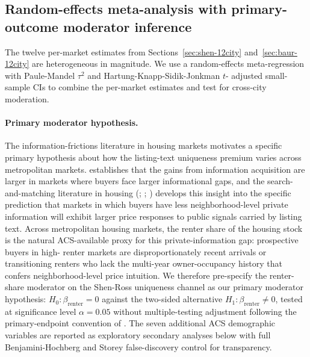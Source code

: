 
\subsection{Random-effects meta-analysis with primary-outcome moderator inference}
\label{sec:meta-regression-12}

The twelve per-market estimates from Sections~\ref{sec:shen-12city}
and~\ref{sec:baur-12city} are heterogeneous in magnitude.  We use a
random-effects meta-regression with Paule-Mandel $\tau^2$
\citep{paule1982consensus} and Hartung-Knapp-Sidik-Jonkman $t$-
adjusted small-sample CIs \citep{inthout2014hartung} to combine the
per-market estimates and test for cross-city moderation.

\paragraph{Primary moderator hypothesis.}
The information-frictions literature in housing markets motivates a
specific primary hypothesis about how the listing-text uniqueness
premium varies across metropolitan markets.
\citet{stigler1961economics} establishes that the gains from information
acquisition are larger in markets where buyers face larger
informational gaps, and the search-and-matching literature in housing
(\citealt{genesove1997equity}; \citealt{bayer2007unified};
\citealt{anenberg2020housing}) develops this insight into the specific
prediction that markets in which buyers have less neighborhood-level
private information will exhibit larger price responses to public
signals carried by listing text.  Across metropolitan housing markets,
the renter share of the housing stock is the natural ACS-available
proxy for this private-information gap: prospective buyers in high-
renter markets are disproportionately recent arrivals or transitioning
renters who lack the multi-year owner-occupancy history that confers
neighborhood-level price intuition.  We therefore pre-specify the
renter-share moderator on the Shen-Ross uniqueness channel as our
primary moderator hypothesis: $H_0: \beta_{\mathrm{renter}} = 0$
against the two-sided alternative
$H_1: \beta_{\mathrm{renter}} \neq 0$, tested at significance
level $\alpha = 0.05$ without multiple-testing adjustment following
the primary-endpoint convention of \citet{westfall2001optimally}.
The seven additional ACS demographic variables are reported as
exploratory secondary analyses below with full Benjamini-Hochberg
and Storey false-discovery control for transparency.

